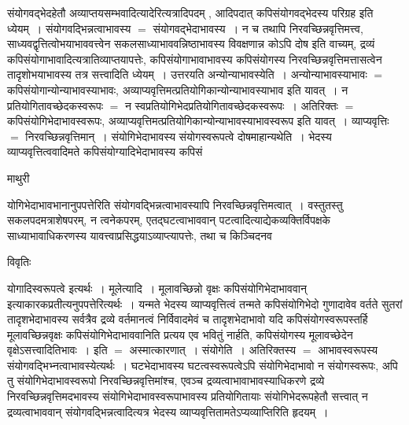 \documentclass[10pt, openany]{book}
\begin{document}
{संयोगवद्भेदहेतौ अव्याप्तयसम्भवादित्यादेरित्यत्रादिपदम् , आदिपदात् कपिसंयोगवद्भेदस्य परिग्रह इति ध्येयम्~। संयोगवद्भिन्नत्वाभावस्य $=$ संयोगवद्भेदाभावस्य~। न च तथापि निरवच्छिन्नवृत्तिमत्त्व, साध्यवद्वृत्तित्वोभयाभाववत्त्वेन सकलसाध्याभाववन्निष्ठाभावस्य विवक्षणान्न कोऽपि दोष इति वाच्यम्, द्रव्यं कपिसंयोगाभावादित्यत्रातिव्याप्तयापत्तेः, कपिसंयोगाभावाभावस्य कपिसंयोगस्य निरवच्छिन्नवृत्तिमत्तासत्वेन तादृशोभयाभावस्य तत्र सत्त्वादिति ध्येयम्~। उत्तरयति {\qt अन्योन्याभावस्येति~।} अन्योन्याभावस्याभावः $=$ कपिसंयोगान्योन्याभावस्याभावः, अव्याप्यवृत्तिमत्प्रतियोगिकान्योन्याभावस्याभाव इति यावत्~। न प्रतियोगितावच्छेदकस्वरूपः $=$ न स्वप्रतियोगिभेदप्रतियोगितावच्छेदकस्वरूपः~। अतिरिक्तः $=$ कपिसंयोगिभेदाभावस्वरूपः, अव्याप्यवृत्तिमत्प्रतियोगिकान्योन्याभावस्याभावस्वरूप इति यावत्~। व्याप्यवृत्तिः $=$ निरवच्छिन्नवृत्तिमान्~। संयोगिभेदाभावस्य संयोगस्वरूपत्वे दोषमाहान्यथेति~। भेदस्य व्याप्यवृत्तित्ववादिमते कपिसंयोग्यादिभेदाभावस्य कपिसं
\newpage
 \begin{center}  माथुरी  \end{center} 
{\la योगिभेदाभावभानानुपपत्तेरिति संयोगवद्भिन्नत्वाभावस्यापि निरवच्छिन्नवृत्तिमत्वात्~। वस्तुतस्तु सकलपदमत्राशेषपरम्, न त्वनेकपरम्, एतद्घटत्वाभाववान् पटत्वादित्याद्येकव्यक्तिर्विपक्षके साध्याभावाधिकरणस्य यावत्त्वाप्रसिद्धयाऽव्याप्त्यापत्तेः, तथा च किञ्चिदनव}
\begin{center}     विवृतिः \end{center}
योगादिस्वरूपत्वे इत्यर्थः~। मूलेत्यादि~। मूलावच्छिन्नो वृक्षः कपिसंयोगिभेदाभाववान् इत्याकारकप्रतीत्यनुपपत्तेरित्यर्थः~। यन्मते भेदस्य व्याप्यवृत्तित्वं तन्मते कपिसंयोगिभेदो गुणादावेव वर्तते सुतरां तादृशभेदाभावस्य सर्वत्रैव द्रव्ये वर्तमानत्वं निर्विवादमेवं च तादृशभेदाभावो यदि कपिसंयोगस्वरूपस्तर्हि मूलावच्छिन्नवृक्षः कपिसंयोगिभेदाभाववानिति प्रत्यय एव भवितुं नार्हति, कपिसंयोगस्य मूलावच्छेदेन वृक्षेऽसत्त्वादितिभावः~। इति $=$ अस्मात्कारणात्~। {\la संयोगेति~।} अतिरिक्तस्य $=$ आभावस्वरूपस्य संयोगवद्भिभ्नत्वाभावस्येत्यर्थः~। घटभेदाभावस्य घटत्वस्वरूपत्वेऽपि संयोगिभेदाभावो न संयोगस्वरूपः, अपि तु संयोगिभेदाभावस्वरूपो निरवच्छिन्नवृत्तिमांश्च, एवञ्च
द्रव्यत्वाभावाभावस्याधिकरणे द्रव्ये निरवच्छिन्नवृत्तिमदभावस्य संयोगिभेदाभावस्वरूपाभावस्य प्रतियोगितायाः संयोगिभेदरूपहेतौ सत्त्वात् न द्रव्यत्वाभाववान्
संयोगवद्भिन्नत्वादित्यत्र भेदस्य व्याप्यवृत्तितामतेऽप्यव्याप्तिरिति हृदयम्~।\\


}
\end{document}
